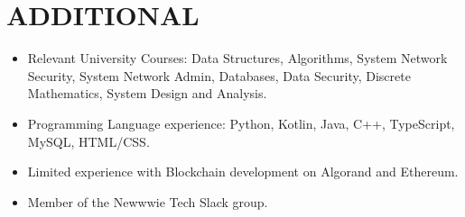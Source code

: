 \documentclass[11.9pt,a4paper,roman]{moderncv}
\begin{document}
\section{ADDITIONAL}
\begin{minipage}{\maincolumnwidth}%
	\small{
    	\begin{itemize}
          \item Relevant University Courses: Data Structures, Algorithms, System Network Security, System Network Admin, Databases, Data Security, Discrete Mathematics, System Design and Analysis. 
          \item Programming Language experience: Python, Kotlin, Java, C++, TypeScript, MySQL, HTML/CSS. 
          \item Limited experience with Blockchain development on Algorand and Ethereum.  
          \item Member of the Newwwie Tech Slack group.  
		\end{itemize}}%
\end{minipage}%
\end{document}
